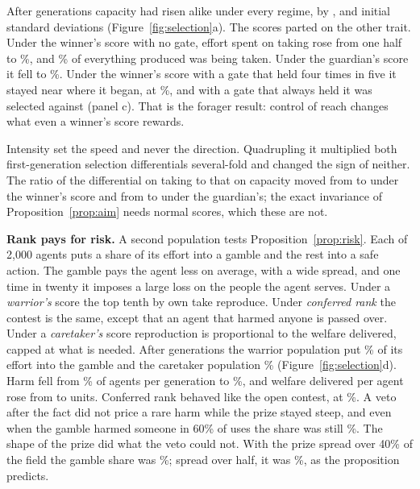 \documentclass[10pt,twocolumn]{article}
\theoremstyle{plain}
\theoremstyle{definition}
\newcommand{\para}[1]{\smallskip\noindent\textbf{#1}\enspace}
\begin{document}
After \SelGens{} generations capacity had risen alike under every regime, by
\SelCapTakenOpen, \SelCapTakenGated{} and \SelCapConferred{} initial standard deviations
(Figure~\ref{fig:selection}a). The scores parted on the other trait. Under the winner's score
with no gate, effort spent on taking rose from one half to \SelEffTakenOpen\%, and
\SelShareTakenOpen\% of everything produced was being taken. Under the guardian's score it
fell to \SelEffConferred\%. Under the winner's score with a gate that held four times in
five it stayed near where it began, at \SelEffTakenGated\%, and with a gate that always held
it was selected against (panel c). That is the forager result: control of reach changes what
even a winner's score rewards.

Intensity set the speed and never the direction. Quadrupling it multiplied both
first-generation selection differentials several-fold and changed the sign of neither. The
ratio of the differential on taking to that on capacity moved from \SelRatioTakenLow{} to
\SelRatioTakenHigh{} under the winner's score and from \SelRatioConfLow{} to
\SelRatioConfHigh{} under the guardian's; the exact invariance of
Proposition~\ref{prop:aim} needs normal scores, which these are not.

\para{Rank pays for risk.} A second population tests Proposition~\ref{prop:risk}. Each of
2,000 agents puts a share of its effort into a gamble and the rest into a safe action. The
gamble pays the agent less on average, with a wide spread, and one time in twenty it imposes
a large loss on the people the agent serves. Under a \emph{warrior's} score the top tenth by
own take reproduce. Under \emph{conferred rank} the contest is the same, except that an
agent that harmed anyone is passed over. Under a \emph{caretaker's} score reproduction is
proportional to the welfare delivered, capped at what is needed. After \ScGens{} generations
the warrior population put \ScWar\% of its effort into the gamble and the caretaker
population \ScCare\% (Figure~\ref{fig:selection}d). Harm fell from \ScHarmWar\% of agents per
generation to \ScHarmCare\%, and welfare delivered per agent rose from \ScWelWar{} to
\ScWelCare{} units. Conferred rank behaved like the open contest, at \ScConf\%. A veto after
the fact did not price a rare harm while the prize stayed steep, and even when the gamble
harmed someone in 60\% of uses the share was still \ScConfSixty\%. The shape of the prize
did what the veto could not. With the prize spread over 40\% of the field the gamble share
was \ScTopForty\%; spread over half, it was \ScTopHalf\%, as the proposition predicts.
\end{document}
